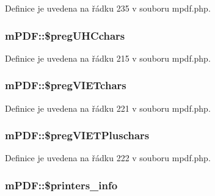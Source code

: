 Definice je uvedena na řádku 235 v souboru mpdf.\-php.

\hypertarget{classm_p_d_f_aa659fcd1b4db599dc78c61040c9238fc}{
\subsubsection[{\$preg\-U\-H\-Cchars}]{\setlength{\rightskip}{0pt plus 5cm}m\-P\-D\-F\-::\$preg\-U\-H\-Cchars}}\label{classm_p_d_f_aa659fcd1b4db599dc78c61040c9238fc}


Definice je uvedena na řádku 215 v souboru mpdf.\-php.

\hypertarget{classm_p_d_f_a6cf318b7bec85d2268f09fbd4222e107}{
\subsubsection[{\$preg\-V\-I\-E\-Tchars}]{\setlength{\rightskip}{0pt plus 5cm}m\-P\-D\-F\-::\$preg\-V\-I\-E\-Tchars}}\label{classm_p_d_f_a6cf318b7bec85d2268f09fbd4222e107}


Definice je uvedena na řádku 221 v souboru mpdf.\-php.

\hypertarget{classm_p_d_f_a38bf80eadb48fa7ea55028c20def3a29}{
\subsubsection[{\$preg\-V\-I\-E\-T\-Pluschars}]{\setlength{\rightskip}{0pt plus 5cm}m\-P\-D\-F\-::\$preg\-V\-I\-E\-T\-Pluschars}}\label{classm_p_d_f_a38bf80eadb48fa7ea55028c20def3a29}


Definice je uvedena na řádku 222 v souboru mpdf.\-php.

\hypertarget{classm_p_d_f_a9b00a9248f59d95b616b800dc77b4868}{
\subsubsection[{\$printers\-\_\-info}]{\setlength{\rightskip}{0pt plus 5cm}m\-P\-D\-F\-::\$printers\-\_\-info}}\label{classm_p_d_f_a9b00a9248f59d95b616b800dc77b4868}


